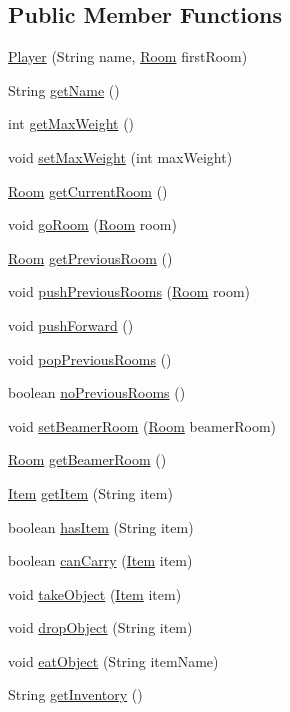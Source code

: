 \subsection*{Public Member Functions}
\begin{DoxyCompactItemize}
\item 
\hyperlink{classPlayer_aa0b4d27c6fa66ab36c3d870eb5f4709a}{Player} (String name, \hyperlink{classRoom}{Room} first\-Room)
\item 
String \hyperlink{classPlayer_a7b17595bbe9876d4aa469ad9bee644dd}{get\-Name} ()
\item 
int \hyperlink{classPlayer_a29c09bad98b48579fec4321698e082d1}{get\-Max\-Weight} ()
\item 
void \hyperlink{classPlayer_a000b1e49bc833a5cffc2a14441c01498}{set\-Max\-Weight} (int max\-Weight)
\item 
\hyperlink{classRoom}{Room} \hyperlink{classPlayer_a3a3107df50fc4e35e8c0f46c3f776ce6}{get\-Current\-Room} ()
\item 
void \hyperlink{classPlayer_a1f5329b83e67a4829a2a775bbb39b6fe}{go\-Room} (\hyperlink{classRoom}{Room} room)
\item 
\hyperlink{classRoom}{Room} \hyperlink{classPlayer_aae81c20b32496c3bc14882828fed4f1b}{get\-Previous\-Room} ()
\item 
void \hyperlink{classPlayer_a9876b243ed81c12d529efb966c7493bd}{push\-Previous\-Rooms} (\hyperlink{classRoom}{Room} room)
\item 
void \hyperlink{classPlayer_aa48b1a95af18f177f07791a4bbc79c11}{push\-Forward} ()
\item 
void \hyperlink{classPlayer_a41ac808d0a06379c58c8f543f0c723a8}{pop\-Previous\-Rooms} ()
\item 
boolean \hyperlink{classPlayer_a145212a16497c374921567ea9a88f546}{no\-Previous\-Rooms} ()
\item 
void \hyperlink{classPlayer_a0a7c3edcdd438c8f6fb628b9926da207}{set\-Beamer\-Room} (\hyperlink{classRoom}{Room} beamer\-Room)
\item 
\hyperlink{classRoom}{Room} \hyperlink{classPlayer_a9114998742351bf793e093cb198993ca}{get\-Beamer\-Room} ()
\item 
\hyperlink{classItem}{Item} \hyperlink{classPlayer_a8c183303976b4ea5d0c10fdbff14e4a1}{get\-Item} (String item)
\item 
boolean \hyperlink{classPlayer_a90cb3f05b491eaed668fe54b9258b755}{has\-Item} (String item)
\item 
boolean \hyperlink{classPlayer_ad84aab6c7b6ed8d58608adf0484f0268}{can\-Carry} (\hyperlink{classItem}{Item} item)
\item 
void \hyperlink{classPlayer_a256305370cf457a32791d68c73e0b236}{take\-Object} (\hyperlink{classItem}{Item} item)
\item 
void \hyperlink{classPlayer_a4fbdbd407197f43f4f7beca517182765}{drop\-Object} (String item)
\item 
void \hyperlink{classPlayer_a83141dd7c002b30a6e19b884daf26e8c}{eat\-Object} (String item\-Name)
\item 
String \hyperlink{classPlayer_a5c4667e6eca93d1bba69f7db022f2feb}{get\-Inventory} ()
\end{DoxyCompactItemize}


